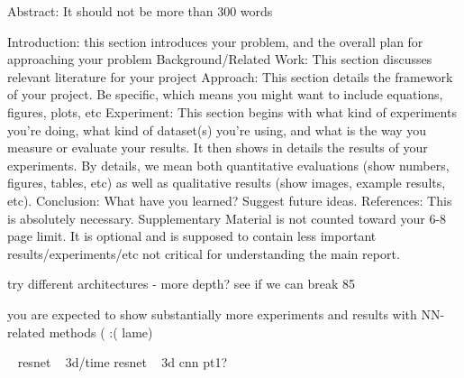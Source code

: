 \documentclass[10pt,twocolumn,letterpaper]{article}
\begin{document}
Abstract: It should not be more than 300 words

Introduction: this section introduces your problem, and the overall plan for approaching your problem
Background/Related Work: This section discusses relevant literature for your project
Approach: This section details the framework of your project. Be specific, which means you might want to include equations, figures, plots, etc
Experiment: This section begins with what kind of experiments you're doing, what kind of dataset(s) you're using, and what is the way you measure or evaluate your results. It then shows in details the results of your experiments. By details, we mean both quantitative evaluations (show numbers, figures, tables, etc) as well as qualitative results (show images, example results, etc).
Conclusion: What have you learned? Suggest future ideas.
References: This is absolutely necessary.
Supplementary Material is not counted toward your 6-8 page limit. It is optional and is supposed to contain less important results/experiments/etc not critical for understanding the main report.

try different architectures - more depth?
see if we can break 85%

you are expected to show substantially more experiments and results with NN-related methods
( :(  lame)

~\cite{he2016deep} resnet
~\cite{tran2018closer} 3d/time resnet
~\cite{hara3dcnns} 3d cnn pt1?


{\small


}
\end{document}
